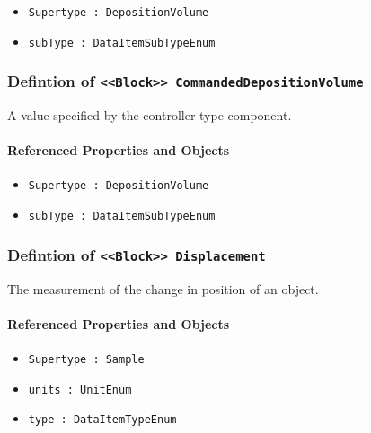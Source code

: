\begin{itemize}
\item \texttt{Supertype : DepositionVolume}

\item \texttt{subType : DataItemSubTypeEnum}

\end{itemize}
\FloatBarrier
\subsubsection{Defintion of \texttt{<<Block>> CommandedDepositionVolume}}
  \label{type:CommandedDepositionVolume}

\FloatBarrier

A value specified by the controller type component.

\FloatBarrier
\paragraph{Referenced Properties and Objects}

\begin{itemize}
\item \texttt{Supertype : DepositionVolume}

\item \texttt{subType : DataItemSubTypeEnum}

\end{itemize}
\FloatBarrier
\subsubsection{Defintion of \texttt{<<Block>> Displacement}}
  \label{type:Displacement}

\FloatBarrier

The measurement of the change in position of an object.

\FloatBarrier
\paragraph{Referenced Properties and Objects}

\begin{itemize}
\item \texttt{Supertype : Sample}

\item \texttt{units : UnitEnum}

\item \texttt{type : DataItemTypeEnum}

\end{itemize}
\FloatBarrier
